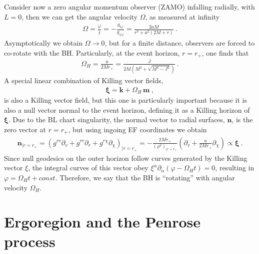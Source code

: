 Consider now a zero angular momentum observer (ZAMO) infalling radially, with $L=0$, then we can get the angular velocity $\Omega$, as measured at infinity
\begin{align}
    \Omega = \frac{\dot{\varphi}}{\dot{t}} = - \frac{g_{t\varphi}}{g_{\varphi\varphi}} = \frac{2 a M}{r^3 + a^2 (2 M+r)} ~.
    \label{eq2:angMomentumZAMO}
\end{align}
Asymptotically we obtain $\Omega\to0$, but for a finite distance, observers are forced to co-rotate with the BH. 
Particularly, at the event horizon, $r=r_+$, one finds that
\begin{align}
    \Omega_H = \frac{a}{2 M r_+} = \frac{J}{2 M \left(M^2+\sqrt{M^4-J^2}\right)} ~.
    \label{eq2:angMomentumH}
\end{align}
A special linear combination of Killing vector fields,
\begin{align}
    \bm{\xi} = \bm{k} + \Omega_H \,\bm{m} ~,
    \label{eq2:KillingXi}
\end{align}
is also a Killing vector field, but this one is particularly important because it is also a null vector normal to the event horizon, defining it as a Killing horizon of $\bm{\xi}$.
Due to the BL chart singularity, the normal vector to radial surfaces, $\bm{n}$, is the zero vector at $r=r_{+}$, but using ingoing EF coordinates we obtain
\begin{align}
    \bm{n}_{|r=r_{+}} = \left( g^{rv} \partial_v + g^{rr} \partial_r + g^{r\chi} \partial_\chi \right)_{|r=r_{+}} = - \frac{2 M r_+}{(\rho^2)_{|r=r_+}} \left( \partial_v + \frac{a}{2 M r_+} \partial_\chi \right) \propto \bm{\xi} ~.
\end{align}
Since null geodesics on the outer horizon follow curves generated by the Killing vector $\xi$, the integral curves of this vector obey $\xi^\alpha \partial_\alpha (\varphi - \Omega_H t) = 0$, resulting in $\varphi = \Omega_H t + const$.
Therefore, we say that the BH is ``rotating'' with angular velocity $\Omega_H$.

\section{Ergoregion and the Penrose process}

